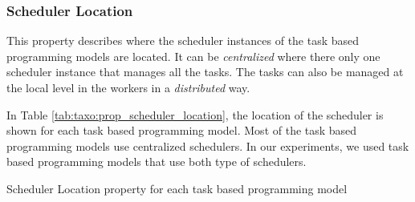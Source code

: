 \subsubsection{Scheduler Location}
This property describes where the scheduler instances of the task based programming models are located.
It can be \textit{centralized} where there only one scheduler instance that manages all the tasks.
The tasks can also be managed at the local level in the workers in a \textit{distributed} way.

In Table \ref{tab:taxo:prop_scheduler_location}, the location of the scheduler is shown for each task based programming model.
Most of the task based programming models use centralized schedulers.
In our experiments, we used task based programming models that use both type of schedulers.

\begin{table}[H]
	\caption{Scheduler Location property for each task based programming model \label{tab:taxo:prop_scheduler_location}}
	\centering
	\begin{multicols}{2}
		

		
	\end{multicols}
\end{table}

%	


%
%
%


